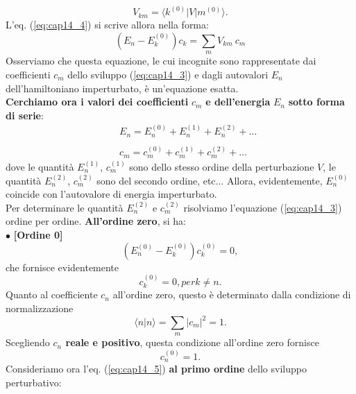\documentclass[a4paper,12pt,oneside]{book}
\begin{document}
\begin{equation}
V_{km} = \langle k^{(0)}\vert V\vert m^{(0)}\rangle.
\end{equation}
L'eq. (\ref{eq:cap14_4}) si scrive allora nella forma:
\begin{equation}
(E_n - E_k ^{(0)}) c_k = \sum _m V_{km}\ c_m
\label{eq:cap14_5}
\end{equation}
Osserviamo che questa equazione, le cui incognite sono rappresentate dai coefficienti $c_m$ dello sviluppo (\ref{eq:cap14_3}) e dagli autovalori $E_n$ dell'hamiltoniano imperturbato, è un'equazione esatta.\\
\textbf{Cerchiamo ora i valori dei coefficienti} $c_m$ \textbf{e dell'energia} $E_n$ \textbf{sotto forma di serie}:
\begin{eqnarray}
& &E_n = E_n ^{(0)}+E_n ^{(1)}+E_n ^{(2)}+\dots \nonumber \\
\\
& &c_m = c_m ^{(0)}+c_m ^{(1)}+c_m ^{(2)}+\dots \nonumber
\end{eqnarray}
dove le quantità $E_n ^{(1)}$, $c_m ^{(1)}$ sono dello stesso ordine della perturbazione $V$, le quantità $E_n ^{(2)}$, $c_m ^{(2)}$ sono del secondo ordine, etc... Allora, evidentemente, $E_n ^{(0)}$ coincide con l'autovalore di energia imperturbato.\\
Per determinare le quantità $E_n ^{(2)}$ e $c_m ^{(2)}$ risolviamo l'equazione (\ref{eq:cap14_3}) ordine per ordine. \textbf{All'ordine zero}, si ha:\\

$\bullet$ \textbf{[Ordine 0]}\\
\begin{equation}
\left(E_n ^{(0)}- E_k ^{(0)}\right)c_k ^{(0)}=0,
\end{equation}
che fornisce evidentemente
\begin{equation}
c_k ^{(0)}=0, per k\neq n.
\label{eq:cap14_6}
\end{equation}
Quanto al coefficiente $c_n$ all'ordine zero, questo è determinato dalla condizione di normalizzazione
\begin{equation}
\langle n \vert n \rangle = \sum _m \vert c_m \vert ^2 =1.
\end{equation}
Scegliendo \textbf{$c_n$ reale e positivo}, questa condizione all'ordine zero fornisce
\begin{equation}
c_n ^{(0)}=1.
\label{eq:cap14_7}
\end{equation}
Consideriamo ora l'eq. (\ref{eq:cap14_5}) \textbf{al primo ordine} dello sviluppo perturbativo:\\
\end{document}
